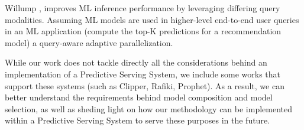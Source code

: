 Willump \cite{Kraft2019}, improves ML inference performance by leveraging differing query modalities. Assuming ML models are used in higher-level end-to-end user queries in an ML application (compute the top-K predictions for a recommendation model) a query-aware adaptive parallelization.

While our work does not tackle directly all the considerations behind an implementation of a Predictive Serving System, we include some works that support these systems (such as Clipper, Rafiki, Prophet). As a result, we can better understand the requirements behind model composition and model selection, as well as sheding light on how our methodology can be implemented within a Predictive Serving System to serve these purposes in the future.